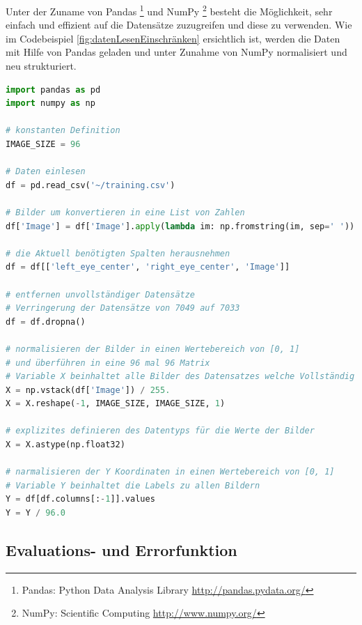 \noindent
Unter der Zuname von Pandas \footnote{Pandas: Python Data Analysis Library \url{http://pandas.pydata.org/}} und NumPy \footnote{NumPy: Scientific Computing \url{http://www.numpy.org/}} besteht die Möglichkeit, sehr einfach und effizient auf die Datensätze zuzugreifen und diese zu verwenden. 
Wie im Codebeispiel \ref{fig:datenLesenEinschränken} ersichtlich ist, werden die Daten mit Hilfe von Pandas geladen und unter Zunahme von NumPy normalisiert und neu strukturiert. 
\begin{lstlisting}[caption={Daten einlesen und einschränken},label=fig:datenLesenEinschränken,captionpos=b,language=Python]
import pandas as pd
import numpy as np

# konstanten Definition
IMAGE_SIZE = 96

# Daten einlesen
df = pd.read_csv('~/training.csv')

# Bilder um konvertieren in eine List von Zahlen
df['Image'] = df['Image'].apply(lambda im: np.fromstring(im, sep=' '))

# die Aktuell benötigten Spalten herausnehmen
df = df[['left_eye_center', 'right_eye_center', 'Image']]

# entfernen unvollständiger Datensätze
# Verringerung der Datensätze von 7049 auf 7033
df = df.dropna()

# normalisieren der Bilder in einen Wertebereich von [0, 1] 
# und überführen in eine 96 mal 96 Matrix
# Variable X beinhaltet alle Bilder des Datensatzes welche Vollständig sind
X = np.vstack(df['Image']) / 255.
X = X.reshape(-1, IMAGE_SIZE, IMAGE_SIZE, 1)

# explizites definieren des Datentyps für die Werte der Bilder
X = X.astype(np.float32)

# narmalisieren der Y Koordinaten in einen Wertebereich von [0, 1]
# Variable Y beinhaltet die Labels zu allen Bildern
Y = df[df.columns[:-1]].values
Y = Y / 96.0
\end{lstlisting}

\subsection{Evaluations- und Errorfunktion}

